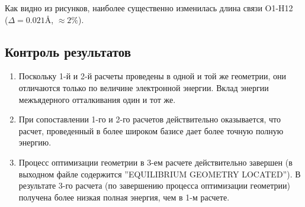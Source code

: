 Как видно из рисунков, наиболее существенно изменилась длина связи O1-H12 \\ ($\Delta = 0.021$\AA, $\approx2\%$).


\subsection{Контроль результатов}
\begin{enumerate}
    \item Поскольку 1-й и 2-й расчеты проведены в одной и той же геометрии, они отличаются только по величине электронной энергии. Вклад энергии межъядерного отталкивания один и тот же.
    \item При сопоставлении 1-го и 2-го расчетов действительно оказывается, что расчет, проведенный в более широком базисе дает более точную полную энергию.
    \item Процесс оптимизации геометрии в 3-ем расчете действительно завершен (в выходном файле содержится ''EQUILIBRIUM GEOMETRY LOCATED''). В результате 3-го расчета (по завершению процесса оптимизации геометрии) получена более низкая полная энергия, чем в 1-м расчете.
\end{enumerate}{}